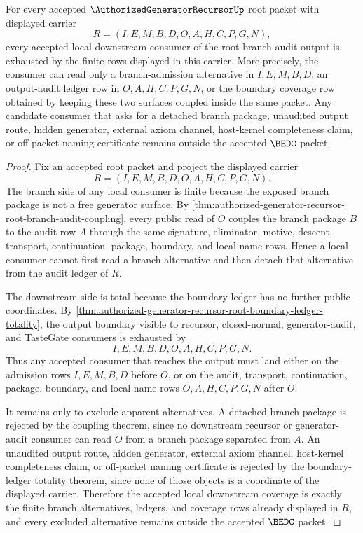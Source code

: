 \begin{theorem}
\label{thm:authorized-generator-recursor-root-branch-audit-downstream-coverage}
For every accepted $\AuthorizedGeneratorRecursorUp$ root packet with displayed carrier
$$
R=(I,E,M,B,D,O,A,H,C,P,G,N),
$$
every accepted local downstream consumer of the root branch-audit output is exhausted by the finite rows displayed in this carrier. More precisely, the consumer can read only a branch-admission alternative in $I,E,M,B,D$, an output-audit ledger row in $O,A,H,C,P,G,N$, or the boundary coverage row obtained by keeping these two surfaces coupled inside the same packet. Any candidate consumer that asks for a detached branch package, unaudited output route, hidden generator, external axiom channel, host-kernel completeness claim, or off-packet naming certificate remains outside the accepted $\BEDC$ packet.
\end{theorem}
\begin{proof}
Fix an accepted root packet and project the displayed carrier
$$
R=(I,E,M,B,D,O,A,H,C,P,G,N).
$$
The branch side of any local consumer is finite because the exposed branch package is not a free generator surface. By \autoref{thm:authorized-generator-recursor-root-branch-audit-coupling}, every public read of $O$ couples the branch package $B$ to the audit row $A$ through the same signature, eliminator, motive, descent, transport, continuation, package, boundary, and local-name rows. Hence a local consumer cannot first read a branch alternative and then detach that alternative from the audit ledger of $R$.

The downstream side is total because the boundary ledger has no further public coordinates. By \autoref{thm:authorized-generator-recursor-root-boundary-ledger-totality}, the output boundary visible to recursor, closed-normal, generator-audit, and TasteGate consumers is exhausted by
$$
I,E,M,B,D,O,A,H,C,P,G,N.
$$
Thus any accepted consumer that reaches the output must land either on the admission rows $I,E,M,B,D$ before $O$, or on the audit, transport, continuation, package, boundary, and local-name rows $O,A,H,C,P,G,N$ after $O$.

It remains only to exclude apparent alternatives. A detached branch package is rejected by the coupling theorem, since no downstream recursor or generator-audit consumer can read $O$ from a branch package separated from $A$. An unaudited output route, hidden generator, external axiom channel, host-kernel completeness claim, or off-packet naming certificate is rejected by the boundary-ledger totality theorem, since none of those objects is a coordinate of the displayed carrier. Therefore the accepted local downstream coverage is exactly the finite branch alternatives, ledgers, and coverage rows already displayed in $R$, and every excluded alternative remains outside the accepted $\BEDC$ packet.
\end{proof}
